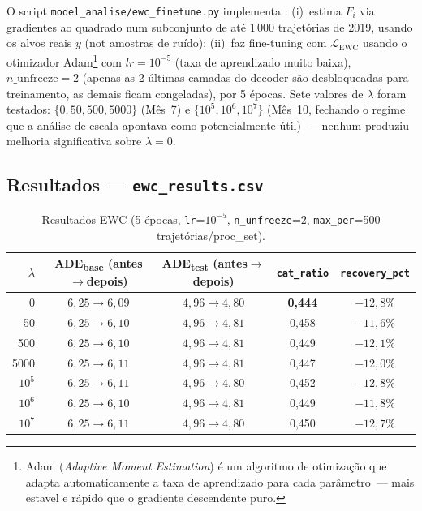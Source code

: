 \documentclass[11pt,a4paper]{article}
\begin{document}
O script \texttt{model\_analise/ewc\_finetune.py} implementa \citet{kirkpatrick2017}: (i)~estima $F_i$ via gradientes ao quadrado num subconjunto de at\'e 1\,000 trajet\'orias de 2019, usando os alvos reais $y$ (not amostras de ru\'ido); (ii)~faz fine-tuning com $\mathcal{L}_\mathrm{EWC}$ usando o otimizador Adam\footnote{Adam (\emph{Adaptive Moment Estimation}) \'e um algoritmo de otimiza\c{c}\~ao que adapta automaticamente a taxa de aprendizado para cada par\^ametro~--- mais estavel e r\'apido que o gradiente descendente puro.} com $lr\!=\!10^{-5}$ (taxa de aprendizado muito baixa), $n\_\mathrm{unfreeze}\!=\!2$ (apenas as 2 \'ultimas camadas do decoder s\~ao desbloqueadas para treinamento, as demais ficam congeladas), por 5 \'epocas. Sete valores de $\lambda$ foram testados: $\{0, 50, 500, 5000\}$ (M\^es~7) e $\{10^5, 10^6, 10^7\}$ (M\^es~10, fechando o regime que a an\'alise de escala apontava como potencialmente \'util)~--- nenhum produziu melhoria significativa sobre $\lambda=0$.

\subsection{Resultados --- \texttt{ewc\_results.csv}}

\begin{table}[H]
\centering
\caption{Resultados EWC (5 \'epocas, \texttt{lr}=$10^{-5}$,
         \texttt{n\_unfreeze}=2, \texttt{max\_per}=500 trajet\'orias/proc\_set).}
\label{tab:ewc}
\begin{tabular}{rcccc}
\hline
$\lambda$ & ADE\textsubscript{base} (antes$\to$depois) & ADE\textsubscript{test} (antes$\to$depois) & \texttt{cat\_ratio} & \texttt{recovery\_pct} \\
\hline
0   & $6{,}25 \to 6{,}09$ & $4{,}96 \to 4{,}80$ & \textbf{0{,}444} & $-12{,}8\%$ \\
50  & $6{,}25 \to 6{,}10$ & $4{,}96 \to 4{,}81$ & 0{,}458          & $-11{,}6\%$ \\
500 & $6{,}25 \to 6{,}10$ & $4{,}96 \to 4{,}81$ & 0{,}449          & $-12{,}1\%$ \\
5000 & $6{,}25 \to 6{,}11$ & $4{,}96 \to 4{,}81$ & 0{,}447          & $-12{,}0\%$ \\
\hline
$10^{5}$ & $6{,}25 \to 6{,}11$ & $4{,}96 \to 4{,}80$ & 0{,}452 & $-12{,}8\%$ \\
$10^{6}$ & $6{,}25 \to 6{,}10$ & $4{,}96 \to 4{,}81$ & 0{,}449 & $-11{,}8\%$ \\
$10^{7}$ & $6{,}25 \to 6{,}11$ & $4{,}96 \to 4{,}80$ & 0{,}450 & $-12{,}7\%$ \\
\hline
\end{tabular}
\end{table}
\end{document}

